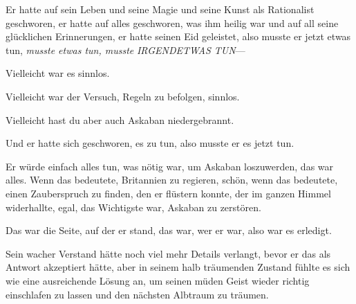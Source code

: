 Er hatte auf sein Leben und seine Magie und seine Kunst als Rationalist geschworen, er hatte auf alles geschworen, was ihm heilig war und auf all seine glücklichen Erinnerungen, er hatte seinen Eid geleistet, also musste er jetzt etwas tun, \emph{musste etwas tun, musste} \emph{IRGENDETWAS TUN}—

Vielleicht war es sinnlos.

Vielleicht war der Versuch, Regeln zu befolgen, sinnlos.

Vielleicht hast du aber auch Askaban niedergebrannt.

Und er hatte sich geschworen, es zu tun, also musste er es jetzt tun.

Er würde einfach alles tun, was nötig war, um Askaban loszuwerden, das war alles. Wenn das bedeutete, Britannien zu regieren, schön, wenn das bedeutete, einen Zauberspruch zu finden, den er flüstern konnte, der im ganzen Himmel widerhallte, egal, das Wichtigste war, Askaban zu zerstören.

Das war die Seite, auf der er stand, das war, wer er war, also war es erledigt.

Sein wacher Verstand hätte noch viel mehr Details verlangt, bevor er das als Antwort akzeptiert hätte, aber in seinem halb träumenden Zustand fühlte es sich wie eine ausreichende Lösung an, um seinen müden Geist wieder richtig einschlafen zu lassen und den nächsten Albtraum zu träumen.


